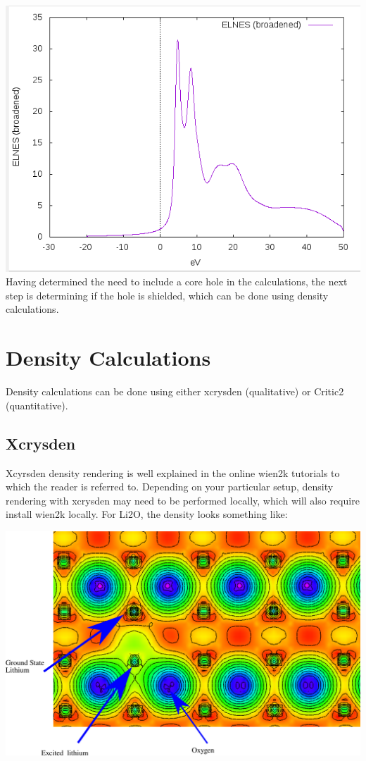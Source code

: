 \documentclass[12pt]{article}
\begin{document}
\includegraphics[scale=0.4]{./images/full_hole_elnes.png}\\

Having determined the need to include a core hole in the calculations, the next step is determining if the hole is shielded, which can be done using density calculations.


\section{Density Calculations}
Density calculations can be done using either xcrysden (qualitative) or Critic2 (quantitative).


\subsection{Xcrysden}
Xcyrsden density rendering is well explained in the online wien2k tutorials to which the reader is referred to.  Depending on your particular setup, density rendering with xcrysden may need to be performed locally, which will also require install wien2k locally.  For Li2O, the density looks something like: 

\includegraphics[scale=0.3]{./images/density_plot_labeled.png}
\end{document}

